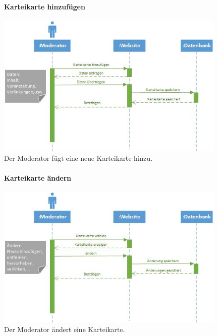 \documentclass[12pt,a4paper]{article}
\begin{document}
\begin{figure}[H]
	\centering
	\paragraph{Karteikarte hinzufügen}
	\includegraphics[width=\textwidth]{Bilder/Sequenzdiagramme/KarteikarteHinzufuegen1.jpg}
	\caption{Der Moderator fügt eine neue Karteikarte hinzu.}
	\label{SzKarteikarteHinzufuegen}
\end{figure}
\begin{figure}[H]
	\centering
	\paragraph{Karteikarte ändern}
	\includegraphics[width=\textwidth]{Bilder/Sequenzdiagramme/KarteikarteAendern1.jpg}
	\caption{Der Moderator ändert eine Karteikarte.}
	\label{SzKarteikarteAendern}
\end{figure}
\end{document}
